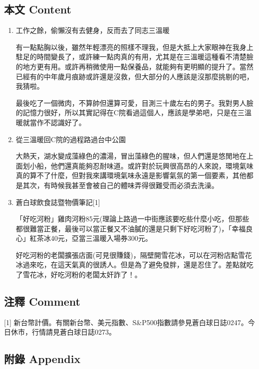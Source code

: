 \documentclass[a5paper, 11pt
]{book}
\begin{document}
\hypertarget{ux672cux6587-content-27}{%
\subsection{本文 Content}\label{ux672cux6587-content-27}}

\begin{enumerate}
\def\labelenumi{\arabic{enumi}.}
\item
  工作之餘，偷懶沒有去健身，反而去了同志三溫暖

  有一點點胸以後，雖然年輕漂亮的照樣不理我，但是大抵上大家眼神在我身上駐足的時間變長了，或許練一點肉真的有用，尤其是在三溫暖這種看不清楚臉的地方更有用。或許再稍微使用一點保養品，就能夠有更明顯的提升了。當然已經有的中年歲月痕跡或許還是沒救，但大部分的人應該是沒那麼挑剔的吧，我猜啦。

  最後吃了一個微肉，不算帥但還算可愛，目測三十歲左右的男子。我對男人臉的記憶力很好，所以其實記得在C院看過這個人，應該是學弟吧，只是在三溫暖就當作不認識好了。
\item
  從三溫暖回C院的過程路過台中公園

  大熱天，湖水變成藻綠色的濃湯，冒出藻綠色的腥味，但人們還是悠閒地在上面划小船，他們還真能夠忍耐味道。或許對於玩興很高昂的人來說，環境氣味真的算不了什麼，但對我來講環境氣味永遠是影響氣氛的第一個要素，其他都是其次，有時候我甚至會被自己的體味弄得很難受而必須去洗澡。
\item
  蒼白球飲食誌暨物價筆記{[}1{]}

  「好吃河粉」雞肉河粉85元(理論上路過一中街應該要吃些什麼小吃，但那些都很難當正餐，最後可以當正餐又不油膩的還是只剩下好吃河粉了)，「幸福良心」紅茶冰40元，亞當三溫暖入場券300元。

  好吃河粉的老闆擴張店面(可見很賺錢)，隔壁開雪花冰，可以在河粉店點雪花冰過來吃，在這天氣真的很誘人。但是為了避免發胖，還是忍住了。差點就吃了雪花冰，好吃河粉的老闆太奸詐了！。
\end{enumerate}

\hypertarget{ux6ce8ux91cb-comment-27}{%
\subsection{注釋 Comment}\label{ux6ce8ux91cb-comment-27}}

{[}1{]}
新台幣計價。有關新台幣、美元指數、S\&P500指數請參見蒼白球日誌0247。今日休市，行情請見蒼白球日誌0273。

\hypertarget{ux9644ux9304-appendix-27}{%
\subsection{附錄 Appendix}\label{ux9644ux9304-appendix-27}}
\end{document}
